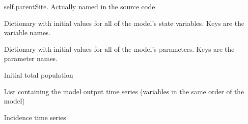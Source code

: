 \documentclass[letterpaper,10pt,english]{sphinxmanual}
\begin{document}
\begin{fulllineitems}
\label{\detokenize{scripting:Site}}
self.parentSite. Actually named  in the source code.

\begin{fulllineitems}
\label{\detokenize{scripting:Site.bi}}
Dictionary with initial values for all of the model’s state variables. Keys are the variable names.

\end{fulllineitems}


\begin{fulllineitems}
\label{\detokenize{scripting:Site.bp}}
Dictionary with initial values for all of the model’s parameters. Keys are the parameter names.

\end{fulllineitems}


\begin{fulllineitems}
\label{\detokenize{scripting:Site.totpop}}
Initial total population

\end{fulllineitems}


\begin{fulllineitems}
\label{\detokenize{scripting:Site.ts}}
List containing the model output time series (variables in the same order of the model)

\end{fulllineitems}


\begin{fulllineitems}
\label{\detokenize{scripting:Site.incidence}}
Incidence time series


\end{fulllineitems}
\end{fulllineitems}
\end{document}
